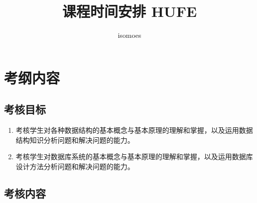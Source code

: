 \documentclass{../note}
\title{课程时间安排 HUFE}
\author{isomoes}
\begin{document}
\maketitle

\section{考纲内容}

\subsection{考核目标}
\begin{enumerate}
	\item 考核学生对各种数据结构的基本概念与基本原理的理解和掌握，以及运用数据结构知识分析问题和解决问题的能力。
	\item 考核学生对数据库系统的基本概念与基本原理的理解和掌握，以及运用数据库设计方法分析问题和解决问题的能力。
\end{enumerate}

\subsection{考核内容}
\end{document}
